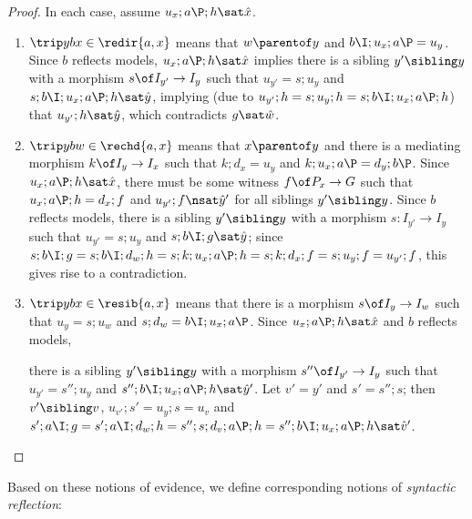 %
\begin{proof}
In each case, assume $u_x;a\P;h\sat \hat x$.
\begin{enumerate}
\item $\trip ybx\in \redir{a,x}$ means that $w\parentof y$ and $b\I;u_x;a\P=u_y$. Since $b$ reflects models, $u_x;a\P;h\sat \hat x$ implies there is a sibling $y'\sibling y$ with a morphism $s\of I_{y'}\to I_y$ such that $u_{y'}=s;u_y$ and $s;b\I;u_x;a\P;h\sat \hat y$, implying (due to $u_{y'};h=s;u_y;h=s;b\I;u_x;a\P;h$) that $u_{y'};h\sat \hat y$, which contradicts $g\sat \hat w$.

\item $\trip ybw\in \rechd{a,x}$ means that $x\parentof y$ and there is a mediating morphism $k\of I_y\to I_x$ such that $k;d_x=u_y$ and $k;u_x;a\P=d_y;b\P$. Since $u_x;a\P;h\sat \hat x$, there must be some witness $f\of P_x\to G$ such that $u_x;a\P;h=d_x;f$ and $u_{y'};f\nsat \hat y'$ for all siblings $y'\sibling y$. Since $b$ reflects models, there is a sibling $y'\sibling y$ with a morphism $s:I_{y'}\to I_y$ such that $u_{y'}=s;u_y$ and $s;b\I;g\sat \hat y$; since $s;b\I;g= s;b\I;d_w;h= s;k;u_x;a\P;h=s;k;d_x;f=s;u_y;f=u_{y'};f$, this gives rise to a contradiction.

\item $\trip ybx\in \resib{a,x}$ means that there is a morphism $s\of I_y\to I_w$ such that $u_y=s;u_w$ and $s;d_w=b\I;u_x;a\P$. Since $u_x;a\P;h\sat \hat x$ and $b$ reflects models, 

there is a sibling $y'\sibling y$ with a morphism $s''\of I_{y'}\to I_y$ such that $u_{y'}=s'';u_y$ and $s'';b\I;u_x;a\P;h\sat \hat y'$. Let $v'=y'$ and $s'=s'';s$; then $v'\sibling v$, $u_{v'};s'=u_y;s=u_v$ and $s';a\I;g= s';a\I;d_w;h= s'';s;d_v;a\P;h= s'';b\I;u_x;a\P;h \sat \hat v'$.
\end{enumerate}
\end{proof}
%
Based on these notions of evidence, we define corresponding notions of \emph{syntactic reflection}:

